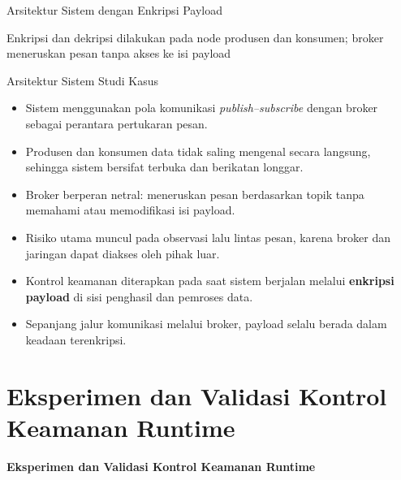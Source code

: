 \documentclass[aspectratio=169, table]{beamer}
\begin{document}
\begin{frame}{Arsitektur Sistem dengan Enkripsi Payload}
{
	}

	{\footnotesize Enkripsi dan dekripsi dilakukan pada node produsen dan konsumen; broker meneruskan pesan tanpa akses ke isi payload}
\end{frame}


\begin{frame}{Arsitektur Sistem Studi Kasus}
	\vspace{10pt}
	\begin{itemize}\small
		\item Sistem menggunakan pola komunikasi \emph{publish--subscribe} dengan broker sebagai perantara pertukaran pesan.
		\item Produsen dan konsumen data tidak saling mengenal secara langsung, sehingga sistem bersifat terbuka dan berikatan longgar.
		\item Broker berperan netral: meneruskan pesan berdasarkan topik tanpa memahami atau memodifikasi isi payload.
		\item Risiko utama muncul pada observasi lalu lintas pesan, karena broker dan jaringan dapat diakses oleh pihak luar.
		\item Kontrol keamanan diterapkan pada saat sistem berjalan melalui \textbf{enkripsi payload} di sisi penghasil dan pemroses data.
		\item Sepanjang jalur komunikasi melalui broker, payload selalu berada dalam keadaan terenkripsi.
	\end{itemize}
\end{frame}

\section{Eksperimen dan Validasi Kontrol Keamanan Runtime}

	\begin{frame}{\hfill}
		\centering
		\Huge{\textbf{Eksperimen dan Validasi Kontrol Keamanan Runtime}}
	\end{frame}
\end{document}
